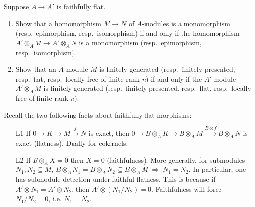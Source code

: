 \documentclass[12pt]{article}
\begin{document}
\begin{exercise}
    Suppose $A \to A'$ is faithfully flat.
    \begin{enumerate}
        \item Show that a homomorphism $M \to N$ of $A$-modules is a monomorphism (resp.\ epimorphism, resp.\ isomorphism) if and only if the homomorphism $A' \otimes_A M \to A' \otimes_A N$ is a monomorphism (resp.\ epimorphism, resp.\ isomorphism).
        \item Show that an $A$-module $M$ is finitely generated (resp.\ finitely presented, resp.\ flat, resp.\ locally free of finite rank $n$) if and only if the $A'$-module $A' \otimes_A M$ is finitely generated (resp.\ finitely presented, resp.\ flat, resp.\ locally free of finite rank $n$).
    \end{enumerate}
\end{exercise}
Recall the two following facts about faithfully flat morphisms:
\begin{enumerate}
    \item[L1] If $0\to K\to M\xrightarrow{f}N$ is exact, then $0\to B\otimes_A K\to B\otimes_A M\xrightarrow{B\otimes f} B\otimes_A N$ is exact (flatness). Dually for cokernels.
    \item[L2] If $B\otimes_A X=0$ then $X=0$ (faithfulness). More generally, for submodules $N_1,N_2\subseteq M$, $B\otimes_A N_1 = B\otimes_A N_2 \subseteq B\otimes_A M \;\Rightarrow\; N_1=N_2$. In particular, one has submodule detection under faithful flatness. This is because if $A'\otimes N_1 = A'\otimes N_2$, then $A'\otimes(N_1/N_2)=0$. Faithfulness will force $N_1/N_2=0$, i.e. $N_1=N_2$.
\end{enumerate}
\end{document}
